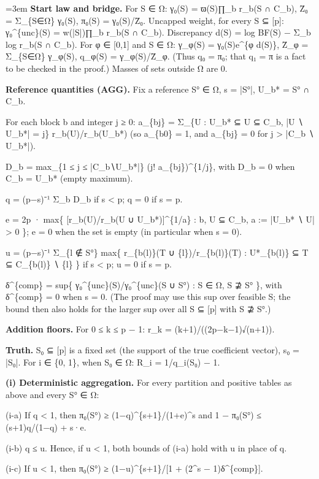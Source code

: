 \documentclass[11pt]{report}
\newenvironment{mdblock}{\begingroup\mdfont\raggedright\setlength{\parindent}{0pt}\setlength{\parskip}{0.55em}\emergencystretch=3em}{\par\endgroup}
\newcommand{\mdhead}[2]{\par\vspace{0.7em}\noindent{\bfseries\ifcase#1\or\large\or\normalsize\or\normalsize\or\small\or\small\or\small\fi #2}\par\nopagebreak\vspace{0.1em}}
\begin{document}
\begin{mdblock}
\textbf{Start law and bridge.} For S ∈ Ω: γ₀(S) = ϖ(S)∏\_b r\_b(S ∩ C\_b), Z̄₀ = Σ\_\{S∈Ω\} γ₀(S), π₀(S) = γ₀(S)/Z̄₀. Uncapped weight, for every S ⊆ [p]: γ₀\textasciicircum{}\{unc\}(S) = w(|S|)∏\_b r\_b(S ∩ C\_b). Discrepancy d(S) = log BF(S) − Σ\_b log r\_b(S ∩ C\_b). For φ ∈ [0,1] and S ∈ Ω: γ\_φ(S) = γ₀(S)e\textasciicircum{}\{φ d(S)\}, Z̄\_φ = Σ\_\{S∈Ω\} γ\_φ(S), q\_φ(S) = γ\_φ(S)/Z̄\_φ. (Thus q₀ = π₀; that q₁ = π is a fact to be checked in the proof.) Masses of sets outside Ω are 0.

\textbf{Reference quantities (AGG).} Fix a reference S° ∈ Ω, s = |S°|, U\_b* = S° ∩ C\_b.

\begin{mdbul}
\item For each block b and integer j ≥ 0: a\_\{bj\} = Σ\_\{U : U\_b* ⊆ U ⊆ C\_b, |U ∖ U\_b*| = j\} r\_b(U)/r\_b(U\_b*) (so a\_\{b0\} = 1, and a\_\{bj\} = 0 for j > |C\_b ∖ U\_b*|).
\item D\_b = max\_\{1 ≤ j ≤ |C\_b∖U\_b*|\} (j! a\_\{bj\})\textasciicircum{}\{1/j\}, with D\_b = 0 when C\_b = U\_b* (empty maximum).
\item q = (p−s)⁻¹ Σ\_b D\_b if s < p; q = 0 if s = p.
\item e = 2p · max\{ [r\_b(U)/r\_b(U ∪ U\_b*)]\textasciicircum{}\{1/a\} : b, U ⊆ C\_b, a := |U\_b* ∖ U| > 0 \}; e = 0 when the set is empty (in particular when s = 0).
\item u = (p−s)⁻¹ Σ\_\{l ∉ S°\} max\{ r\_\{b(l)\}(T ∪ \{l\})/r\_\{b(l)\}(T) : U*\_\{b(l)\} ⊆ T ⊆ C\_\{b(l)\} ∖ \{l\} \} if s < p; u = 0 if s = p.
\item δ\textasciicircum{}\{comp\} = sup\{ γ₀\textasciicircum{}\{unc\}(S)/γ₀\textasciicircum{}\{unc\}(S ∪ S°) : S ∈ Ω, S ⊉ S° \}, with δ\textasciicircum{}\{comp\} = 0 when s = 0. (The proof may use this sup over feasible S; the bound then also holds for the larger sup over all S ⊆ [p] with S ⊉ S°.)
\end{mdbul}

\textbf{Addition floors.} For 0 ≤ k ≤ p − 1: r\_k = (k+1)/((2p−k−1)√(n+1)).

\textbf{Truth.} S₀ ⊆ [p] is a fixed set (the support of the true coefficient vector), s₀ = |S₀|. For i ∈ \{0, 1\}, when S₀ ∈ Ω: R\_i = 1/q\_i(S₀) − 1.

\mdhead{2}{2. Claims}

\textbf{(i) Deterministic aggregation.} For every partition and positive tables as above and every S° ∈ Ω:

\begin{mdbul}
\item (i-a) If q < 1, then π₀(S°) ≥ (1−q)\textasciicircum{}\{s+1\}/(1+e)\textasciicircum{}s and 1 − π₀(S°) ≤ (s+1)q/(1−q) + s·e.
\item (i-b) q ≤ u. Hence, if u < 1, both bounds of (i-a) hold with u in place of q.
\item (i-c) If u < 1, then π₀(S°) ≥ (1−u)\textasciicircum{}\{s+1\}/[1 + (2\textasciicircum{}s − 1)δ\textasciicircum{}\{comp\}].
\end{mdbul}


\end{mdblock}
\end{document}
